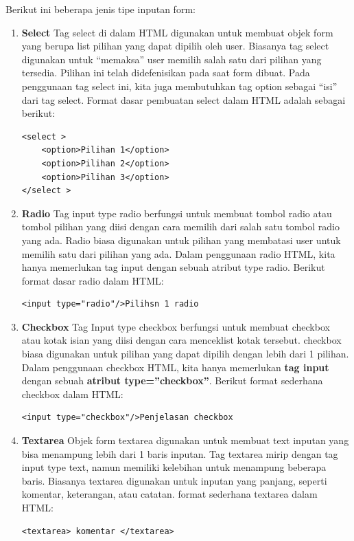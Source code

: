 \documentclass[a4paper,12pt]{article}
\begin{document}
Berikut ini beberapa jenis tipe inputan form:
\begin{enumerate}[label=\textbf{\alph*.}]
    \item \textbf{Select} 
        Tag select di dalam HTML digunakan untuk membuat objek form yang berupa list
        pilihan yang dapat dipilih oleh user. Biasanya tag select digunakan untuk “memaksa”
        user memilih salah satu dari pilihan yang tersedia. Pilihan ini telah didefenisikan pada
        saat form dibuat. Pada penggunaan tag select ini, kita juga membutuhkan tag option sebagai “isi” dari
        tag select. Format dasar pembuatan select dalam HTML adalah sebagai berikut:
        \begin{lstlisting}[language=HTML5]
<select >
    <option>Pilihan 1</option>
    <option>Pilihan 2</option>
    <option>Pilihan 3</option>
</select >
        \end{lstlisting}

    \item \textbf{Radio}
        Tag input type radio berfungsi untuk membuat tombol radio atau tombol pilihan
        yang diisi dengan cara memilih dari salah satu tombol radio yang ada. Radio biasa
        digunakan untuk pilihan yang membatasi user untuk memilih satu dari pilihan yang ada.
        Dalam penggunaan radio HTML, kita hanya memerlukan tag input dengan sebuah
        atribut type radio. Berikut format dasar radio dalam HTML:
        \begin{lstlisting}[language=HTML5]
<input type="radio"/>Pilihsn 1 radio
        \end{lstlisting}

    \item \textbf{Checkbox}
        Tag Input type checkbox berfungsi untuk membuat checkbox atau kotak isian yang
        diisi dengan cara menceklist kotak tersebut. checkbox biasa digunakan untuk pilihan
        yang dapat dipilih dengan lebih dari 1 pilihan. Dalam penggunaan checkbox HTML,
        kita hanya memerlukan \textbf{tag input} dengan sebuah \textbf{atribut type=”checkbox”}. Berikut
        format sederhana checkbox dalam HTML:
        \begin{lstlisting}[language=HTML5]
<input type="checkbox"/>Penjelasan checkbox
        \end{lstlisting}

    \item \textbf{Textarea}
        Objek form textarea digunakan untuk membuat text inputan yang bisa menampung
        lebih dari 1 baris inputan. Tag textarea mirip dengan tag input type text, namun
        memiliki kelebihan untuk menampung beberapa baris. Biasanya textarea digunakan
        untuk inputan yang panjang, seperti komentar, keterangan, atau catatan. format
        sederhana textarea dalam HTML:
        \begin{lstlisting}[language=HTML5]
<textarea> komentar </textarea>
        \end{lstlisting}
\end{enumerate}
\end{document}
